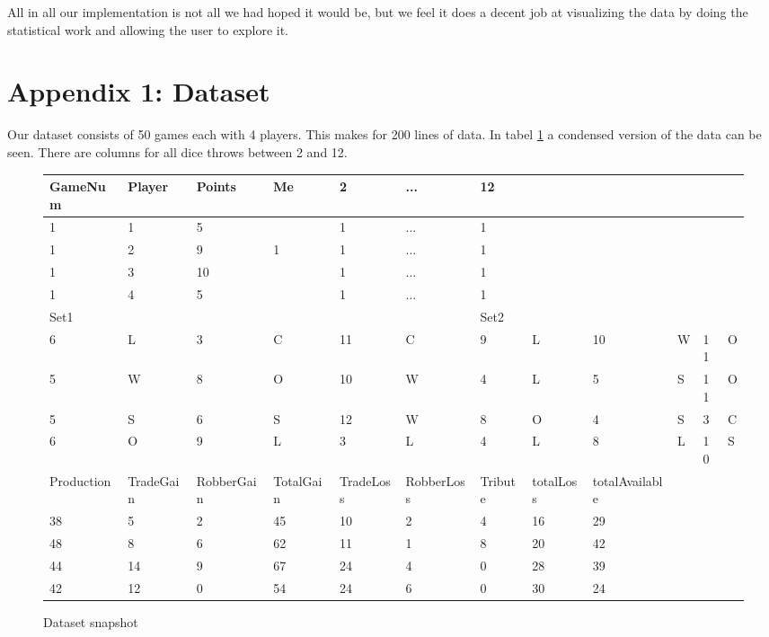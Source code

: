 \documentclass[journal]{vgtc}                %
\begin{document}
All in all our implementation is not all we had hoped it would be, but we feel
it does a decent job at visualizing the data by doing the statistical work and
allowing the user to explore it.


%

%
%
%



\appendix
\newpage
\section{Appendix 1: Dataset}

Our dataset consists of 50 games each with 4 players. This makes for 200 lines
of data. In tabel \ref{tab:data} a condensed version of the data can be seen.
There are columns for all dice throws between 2 and 12.

\begin{figure}[h!]
  \centering
  \begin{tabular}{|l|l|l|l|l|l|l|l|l|l|l|l|}
    \hline
    GameNum & Player & Points & Me & 2 & ... & 12 & & & & & \\ \hline
    1 & 1 & 5 & & 1 & ... & 1 & & & & & \\ \hline
    1 & 2 & 9 & 1 & 1 & ... & 1 & & & & & \\ \hline
    1 & 3 & 10 & & 1 & ... & 1 & & & & & \\ \hline
    1 & 4 & 5 & & 1 & ... & 1 & & & & & \\ \hline \hline
    Set1 & & & & & & Set2 & & & & & \\ \hline
    6 & L & 3 & C & 11 & C & 9 & L & 10 & W & 11 & O \\ \hline
    5 & W & 8 & O & 10 & W & 4 & L & 5 & S & 11 & O \\ \hline
    5 & S & 6 & S & 12 & W & 8 & O & 4 & S & 3 & C \\ \hline
    6 & O & 9 & L & 3 & L & 4 & L & 8 & L & 10 & S \\ \hline \hline
    Production & TradeGain & RobberGain & TotalGain & TradeLoss & RobberLoss &
    Tribute & totalLoss & totalAvailable & & & \\ \hline
    38 & 5 & 2 & 45 & 10 & 2 & 4 & 16 & 29 & & & \\ \hline
    48 & 8 & 6 & 62 & 11 & 1 & 8 & 20 & 42 & & & \\ \hline
    44 & 14 & 9 & 67 & 24 & 4 & 0 & 28 & 39 & & & \\ \hline
    42 & 12 & 0 & 54 & 24 & 6 & 0 & 30 & 24 & & & \\ \hline
  \end{tabular}
  \caption{Dataset snapshot}
  \label{tab:data}
\end{figure}
\end{document}
